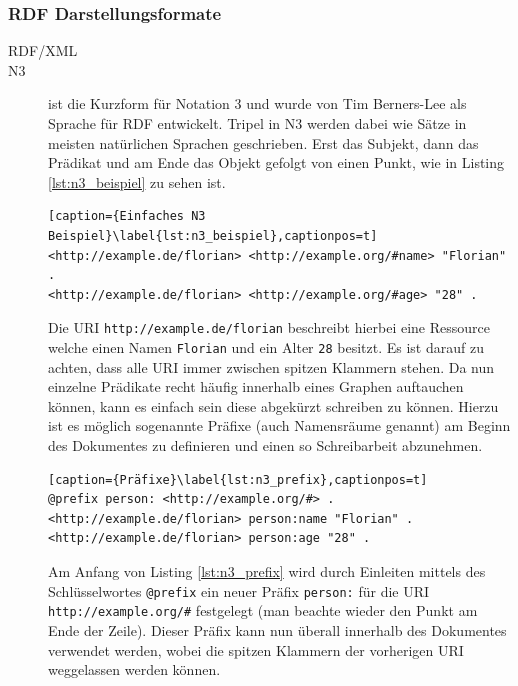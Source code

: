 \subsubsection{RDF Darstellungsformate} %
\label{ssub:rdf_xml_n3}

\begin{description}
    \item[RDF/XML] 
    \item[N3] ist die Kurzform für Notation 3 und wurde von Tim Berners-Lee als Sprache für RDF entwickelt. Tripel in N3 werden dabei wie Sätze in meisten natürlichen Sprachen geschrieben. Erst das Subjekt, dann das Prädikat und am Ende das Objekt gefolgt von einen Punkt, wie in  Listing \ref{lst:n3_beispiel} zu sehen ist.
    \begin{lstlisting}[caption={Einfaches N3 Beispiel}\label{lst:n3_beispiel},captionpos=t]
<http://example.de/florian> <http://example.org/#name> "Florian" .
<http://example.de/florian> <http://example.org/#age> "28" .    \end{lstlisting} 
    Die URI \texttt{http://example.de/florian} beschreibt hierbei eine Ressource welche einen Namen \texttt{Florian} und ein Alter \texttt{28} besitzt. Es ist darauf zu achten, dass alle URI immer zwischen spitzen Klammern stehen. Da nun einzelne Prädikate recht häufig innerhalb eines Graphen auftauchen können, kann es einfach sein diese abgekürzt schreiben zu können. Hierzu ist es möglich sogenannte Präfixe (auch Namensräume genannt) am Beginn des Dokumentes zu definieren und einen so Schreibarbeit abzunehmen.

    \begin{lstlisting}[caption={Präfixe}\label{lst:n3_prefix},captionpos=t]
@prefix person: <http://example.org/#> .
<http://example.de/florian> person:name "Florian" .
<http://example.de/florian> person:age "28" .    \end{lstlisting}

    Am Anfang von Listing \ref{lst:n3_prefix} wird durch Einleiten mittels des Schlüsselwortes \texttt{@prefix} ein neuer Präfix \texttt{person:} für die URI \texttt{http://example.org/\#} festgelegt (man beachte wieder den Punkt am Ende der Zeile). Dieser Präfix kann nun überall innerhalb des Dokumentes verwendet werden, wobei die spitzen Klammern der vorherigen URI weggelassen werden können.


\end{description}

